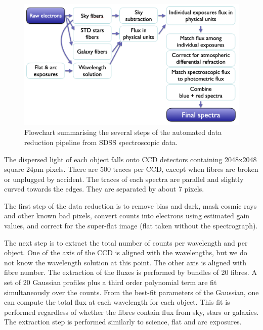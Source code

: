 \begin{figure}[t]
    \centering 
    \includegraphics[width=\textwidth]{fig/spectro/pipeline_flowchart.png}
    \caption{Flowchart summarising the several steps of the automated data reduction pipeline from SDSS spectroscopic data.}
    \label{fig:pipeline}
\end{figure}
 

The dispersed light of each object falls onto CCD detectors containing 
2048x2048 square 24$\mu$m pixels. 
There are 500 traces per CCD, except when fibres are broken or unplugged by accident. 
The traces of each spectra are parallel and slightly curved towards the edges. 
They are separated by about 7 pixels. 

The first step of the data reduction is to remove bias and dark, mask 
cosmic rays and other known bad pixels, 
convert counts into electrons using estimated gain values, 
and correct for the super-flat image (flat taken without the spectrograph). 

The next step is to extract the total number of counts per wavelength and per object.
One of the axis of the CCD is aligned with the wavelengths, but we do not know the
wavelength solution at this point. The other axis is aligned with fibre number. 
The extraction of the fluxes is performed by bundles of 20 fibres. A set of 20 Gaussian
profiles plus a third order polynomial term are fit simultaneously over the counts. 
From the best-fit parameters of the Gaussian, one can compute the total flux at each 
wavelength for each object. This fit is performed regardless of whether the fibres contain 
flux from sky, stars or galaxies. 
The extraction step is performed similarly to science, flat and arc exposures. 


